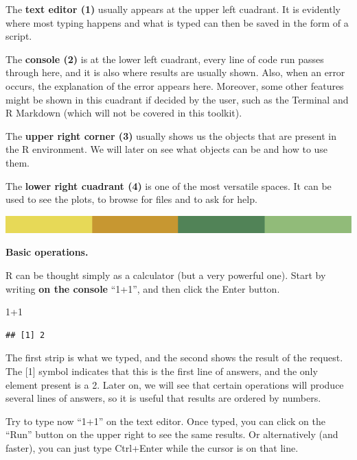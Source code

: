 \documentclass[
]{book}
\newenvironment{Shaded}{\begin{snugshade}}{\end{snugshade}}
\newcommand{\DecValTok}[1]{\textcolor[rgb]{0.00,0.00,0.81}{#1}}
\newcommand{\SpecialCharTok}[1]{\textcolor[rgb]{0.00,0.00,0.00}{#1}}
\begin{document}
The \textbf{text editor (1)} usually appears at the upper left cuadrant. It is evidently where most typing happens and what is typed can then be saved in the form of a script.

The \textbf{console (2)} is at the lower left cuadrant, every line of code run passes through here, and it is also where results are usually shown. Also, when an error occurs, the explanation of the error appears here. Moreover, some other features might be shown in this cuadrant if decided by the user, such as the Terminal and R Markdown (which will not be covered in this toolkit).

The \textbf{upper right corner (3)} usually shows us the objects that are present in the R environment. We will later on see what objects can be and how to use them.

The \textbf{lower right cuadrant (4)} is one of the most versatile spaces. It can be used to see the plots, to browse for files and to ask for help.

\includegraphics{rsrstrip.png}

\textbf{Basic operations.}

R can be thought simply as a calculator (but a very powerful one). Start by writing \textbf{on the console} ``1+1'', and then click the Enter button.

\begin{Shaded}
\begin{Highlighting}[]
\DecValTok{1}\SpecialCharTok{+}\DecValTok{1} 
\end{Highlighting}
\end{Shaded}

\begin{verbatim}
## [1] 2
\end{verbatim}

The first strip is what we typed, and the second shows the result of the request. The {[}1{]} symbol indicates that this is the first line of answers, and the only element present is a 2. Later on, we will see that certain operations will produce several lines of answers, so it is useful that results are ordered by numbers.

Try to type now ``1+1'' on the text editor. Once typed, you can click on the ``Run'' button on the upper right to see the same results. Or alternatively (and faster), you can just type Ctrl+Enter while the cursor is on that line.
\end{document}

